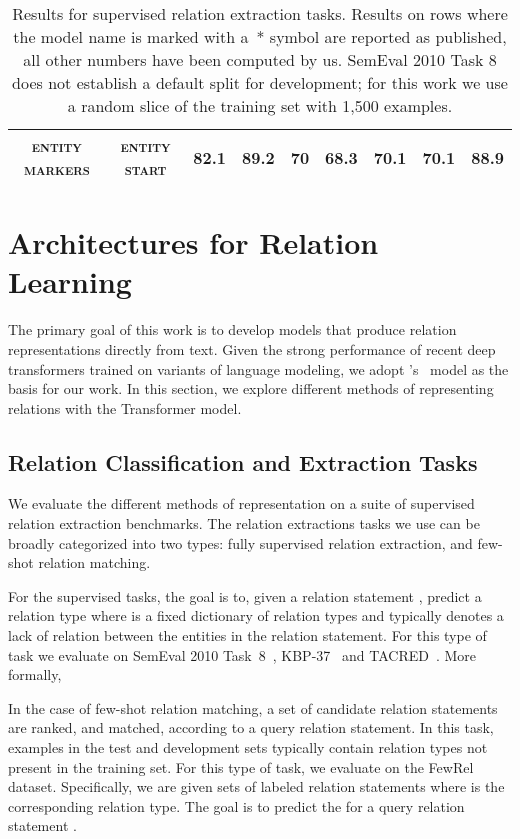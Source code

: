 \begin{table*}[p]
\begin{tabular}{|c|c|cc|cc|cc|c|}
\textsc{entity markers} & \textsc{entity start} & \textbf{82.1} & \textbf{89.2} & \textbf{70} & \textbf{68.3} & \textbf{70.1} & \textbf{70.1} & \textbf{88.9} \\ \hline
    \end{tabular}
    \caption{Results for supervised relation extraction tasks. Results on rows where the model name is marked with a~* symbol are reported as published, all other numbers have been computed by us.
    SemEval 2010 Task 8 does not establish a default split for development; for this work we use a random slice of the training set with 1,500 examples.}
    \label{tab:supervised-results}
\end{table*}

\section{Architectures for Relation Learning}
\label{sec:transformers-rel}

The primary goal of this work is to develop models that produce relation representations
directly from text. Given the strong performance of recent deep transformers trained on
variants of language modeling, we adopt \citet{devlin2018bert}'s \bert~model
as the basis for our work. In this section, we explore different 
methods of representing relations with the Transformer model.


\subsection{Relation Classification and Extraction Tasks}
\label{sec:relation-tasks}



We evaluate the different methods of representation on a suite of supervised relation extraction benchmarks. 
The relation extractions tasks we use can be broadly
categorized into two types: fully supervised relation extraction, and few-shot relation matching.

For the supervised tasks, the goal is to, given a relation statement , predict a relation type  where  is a fixed dictionary of relation types and  typically denotes a lack of relation between the entities in the relation statement.
For this type of task we evaluate on SemEval 2010 Task~8~\cite{hendrickx2009semeval}, KBP-37~\cite{ZhangW15a} and TACRED~\cite{zhang2017position}.
More formally,

In the case of few-shot relation matching, a set of candidate relation statements are ranked, and matched, according to a query relation statement. In this task, examples in the test and development sets typically contain relation types not present in the training set.
For this type of task, we evaluate on the FewRel~\cite{han2018fewrel} dataset. 
Specifically, we are given  sets of  labeled relation statements
 where 
is the corresponding relation type. The goal is to predict the 
for a query relation statement .





